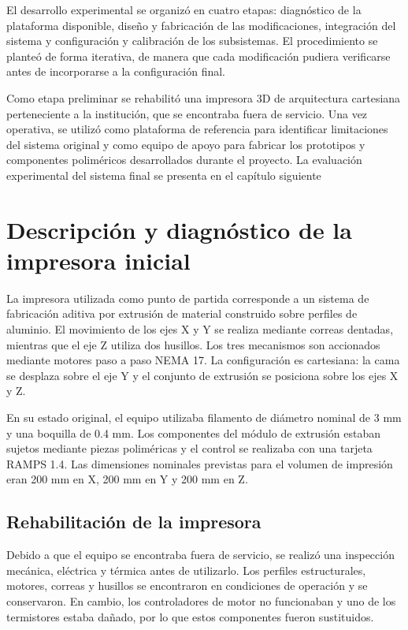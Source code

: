 El desarrollo experimental se organizó en cuatro etapas: diagnóstico de la plataforma disponible, diseño y fabricación de las modificaciones, integración del sistema y configuración y calibración de los subsistemas. El procedimiento se planteó de forma iterativa, de manera que cada modificación pudiera verificarse antes de incorporarse a la configuración final.

Como etapa preliminar se rehabilitó una impresora 3D de arquitectura cartesiana perteneciente a la institución, que se encontraba fuera de servicio. Una vez operativa, se utilizó como plataforma de referencia para identificar limitaciones del sistema original y como equipo de apoyo para fabricar los prototipos y componentes poliméricos desarrollados durante el proyecto. La evaluación experimental del sistema final se presenta en el capítulo siguiente


\section{Descripción y diagnóstico de la impresora inicial}
La impresora utilizada como punto de partida corresponde a un sistema de fabricación aditiva por extrusión de material construido sobre perfiles de aluminio. El movimiento de los ejes X y Y se realiza mediante correas dentadas, mientras que el eje Z utiliza dos husillos. Los tres mecanismos son accionados mediante motores paso a paso NEMA 17. La configuración es cartesiana: la cama se desplaza sobre el eje Y y el conjunto de extrusión se posiciona sobre los ejes X y Z.

En su estado original, el equipo utilizaba filamento de diámetro nominal de 3 mm y una boquilla de 0.4 mm. Los componentes del módulo de extrusión estaban sujetos mediante piezas poliméricas y el control se realizaba con una tarjeta RAMPS 1.4. Las dimensiones nominales previstas para el volumen de impresión eran 200 mm en X, 200 mm en Y y 200 mm en Z.

\subsection{Rehabilitación de la impresora}
\label{subsec:rehabilitacion_impresora}
Debido a que el equipo se encontraba fuera de servicio, se realizó una inspección mecánica, eléctrica y térmica antes de utilizarlo. Los perfiles estructurales, motores, correas y husillos se encontraron en condiciones de operación y se conservaron. En cambio, los controladores de motor no funcionaban y uno de los termistores estaba dañado, por lo que estos componentes fueron sustituidos.

